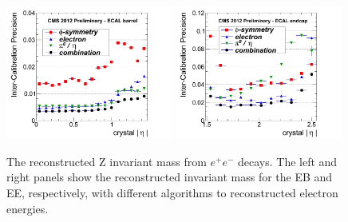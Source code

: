 \begin{figure}
 \centering
\includegraphics[width=0.49\textwidth]{CMS_DetectorFigures/2012EBprecWithCombV3.png}
\includegraphics[width=0.49\textwidth]{CMS_DetectorFigures/2012EEprecWithCombV3.png}
\caption{The reconstructed Z invariant mass from $e^{+}e^{-}$
  decays. The left and right panels show the reconstructed invariant mass for
  the EB and EE, respectively, with different algorithms to reconstructed electron energies.\label{fig:ECAL_ICPrecision}}
\end{figure}

